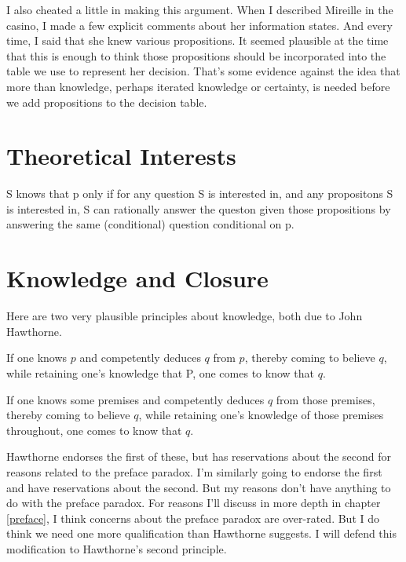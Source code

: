 \documentclass[11pt,]{book}
\providecommand{\tightlist}{%
  \setlength{\itemsep}{0pt}\setlength{\parskip}{0pt}}
\begin{document}
I also cheated a little in making this argument. When I described Mireille in the casino, I made a few explicit comments about her information states. And every time, I said that she knew various propositions. It seemed plausible at the time that this is enough to think those propositions should be incorporated into the table we use to represent her decision. That's some evidence against the idea that more than knowledge, perhaps iterated knowledge or certainty, is needed before we add propositions to the decision table.

\hypertarget{theoretical-interests}{%
\section{Theoretical Interests}\label{theoretical-interests}}

S knows that p only if for any question S is interested in, and any propositons S is interested in, S can rationally answer the queston given those propositions by answering the same (conditional) question conditional on p.

\hypertarget{knowledge-and-closure}{%
\section{Knowledge and Closure}\label{knowledge-and-closure}}

Here are two very plausible principles about knowledge, both due to John Hawthorne.

\begin{description}
\tightlist
\item[Single Premise Closure]
If one knows \(p\) and competently deduces \(q\) from \(p\), thereby coming to believe \(q\), while retaining one's knowledge that P, one comes to know that \(q\). \citep[43]{Hawthorne2005}
\item[Multiple Premise Closure]
If one knows some premises and competently deduces \(q\) from those premises, thereby coming to believe \(q\), while retaining one's knowledge of those premises throughout, one comes to know that \(q\). \citep[43]{Hawthorne2005}
\end{description}

Hawthorne endorses the first of these, but has reservations about the second for reasons related to the preface paradox. I'm similarly going to endorse the first and have reservations about the second. But my reasons don't have anything to do with the preface paradox. For reasons I'll discuss in more depth in chapter \ref{preface}, I think concerns about the preface paradox are over-rated. But I do think we need one more qualification than Hawthorne suggests. I will defend this modification to Hawthorne's second principle.
\end{document}
